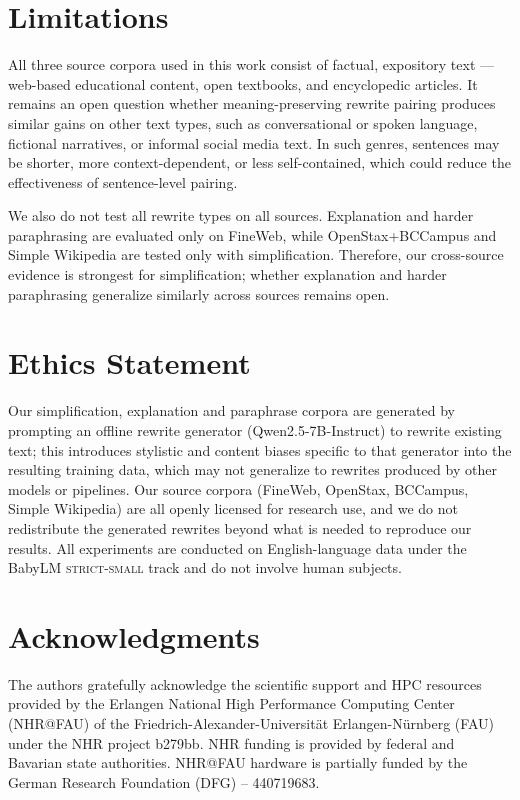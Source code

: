 \documentclass[11pt]{article}
\begin{document}
\section*{Limitations}
\label{sec:limitations}

All three source corpora used in this work consist of factual, expository text --- web-based educational content, open textbooks, and encyclopedic articles. It remains an open question whether meaning-preserving rewrite pairing produces similar gains on other text types, such as conversational or spoken language, fictional narratives, or informal social media text. In such genres, sentences may be shorter, more context-dependent, or less self-contained, which could reduce the effectiveness of sentence-level pairing.

We also do not test all rewrite types on all sources. Explanation and harder paraphrasing are evaluated only on FineWeb, while OpenStax+BCCampus and Simple Wikipedia are tested only with simplification. Therefore, our cross-source evidence is strongest for simplification; whether explanation and harder paraphrasing generalize similarly across sources remains open.
\section*{Ethics Statement}
Our simplification, explanation and paraphrase corpora are generated by prompting an offline rewrite generator (Qwen2.5-7B-Instruct) to rewrite existing text; this introduces stylistic and content biases specific to that generator into the resulting training data, which may not generalize to rewrites produced by other models or pipelines. Our source corpora (FineWeb, OpenStax, BCCampus, Simple Wikipedia) are all openly licensed for research use, and we do not redistribute the generated rewrites beyond what is needed to reproduce our results. All experiments are conducted on English-language data under the BabyLM \textsc{strict-small} track and do not involve human subjects.

\section*{Acknowledgments}
The authors gratefully acknowledge the scientific support and HPC resources provided by the Erlangen National High Performance Computing Center (NHR@FAU) of the Friedrich-Alexander-Universität Erlangen-Nürnberg (FAU) under the NHR project b279bb. NHR funding is provided by federal and Bavarian state authorities. NHR@FAU hardware is partially funded by the German Research Foundation (DFG) -- 440719683.
\end{document}
